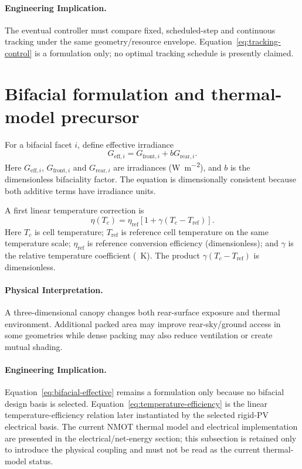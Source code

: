 \documentclass[11pt,a4paper]{article}
\begin{document}
\paragraph{Engineering Implication.}
The eventual controller must compare fixed, scheduled-step and continuous tracking under the same geometry/resource envelope. Equation~\eqref{eq:tracking-control} is a formulation only; no optimal tracking schedule is presently claimed.

\section{Bifacial formulation and thermal-model precursor}
For a bifacial facet \(i\), define effective irradiance
\begin{equation}
G_{\mathrm{eff},i}
=
G_{\mathrm{front},i}
+
bG_{\mathrm{rear},i}.
\label{eq:bifacial-effective}
\end{equation}
Here \(G_{\mathrm{eff},i}\), \(G_{\mathrm{front},i}\) and \(G_{\mathrm{rear},i}\) are irradiances (\si{\watt\per\square\metre}), and \(b\) is the dimensionless bifaciality factor. The equation is dimensionally consistent because both additive terms have irradiance units.

A first linear temperature correction is
\begin{equation}
\eta(T_c)
=
\eta_{\mathrm{ref}}
\left[
1+\gamma(T_c-T_{\mathrm{ref}})
\right].
\label{eq:temperature-efficiency}
\end{equation}
Here \(T_c\) is cell temperature; \(T_{\mathrm{ref}}\) is reference cell temperature on the same temperature scale; \(\eta_{\mathrm{ref}}\) is reference conversion efficiency (dimensionless); and \(\gamma\) is the relative temperature coefficient (\si{\per\kelvin}). The product \(\gamma(T_c-T_{\mathrm{ref}})\) is dimensionless.

\paragraph{Physical Interpretation.}
A three-dimensional canopy changes both rear-surface exposure and thermal environment. Additional packed area may improve rear-sky/ground access in some geometries while dense packing may also reduce ventilation or create mutual shading.

\paragraph{Engineering Implication.}
Equation~\eqref{eq:bifacial-effective} remains a formulation only because no bifacial design basis is selected. Equation~\eqref{eq:temperature-efficiency} is the linear temperature-efficiency relation later instantiated by the selected rigid-PV electrical basis. The current NMOT thermal model and electrical implementation are presented in the electrical/net-energy section; this subsection is retained only to introduce the physical coupling and must not be read as the current thermal-model status.
\end{document}

